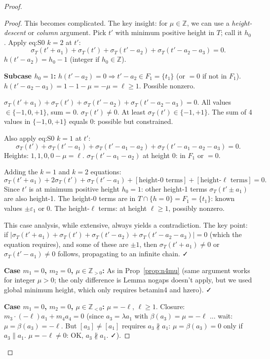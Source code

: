 \begin{proof}
\begin{proof}
This becomes complicated. The key insight: for $\mu\in\mathbb{Z}$, we can use a \emph{height-descent} or \emph{column} argument. Pick $t'$ with minimum positive height in $T$; call it $h_0$. Apply eq:S0 $k=2$ at $t'$:
\[
  \sigma_T(t'+a_1)+\sigma_T(t')+\sigma_T(t'-a_2)+\sigma_T(t'-a_2-a_3)=0.
\]
$h(t'-a_2)=h_0-1$ (integer if $h_0\in\mathbb{Z}$).

\textbf{Subcase $h_0=1$:} $h(t'-a_2)=0\Rightarrow t'-a_2\in F_1=\{t_1\}$ (or $=0$ if not in $F_1$). $h(t'-a_2-a_3)=1-1-\mu=-\mu=\ell\geq 1$. Possible nonzero.

$\sigma_T(t'+a_1)+\sigma_T(t')+\sigma_T(t'-a_2)+\sigma_T(t'-a_2-a_3)=0$. All values $\in\{-1,0,+1\}$, sum = 0. $\sigma_T(t')\neq 0$. At least $\sigma_T(t')\in\{-1,+1\}$. The sum of 4 values in $\{-1,0,+1\}$ equals 0: possible but constrained.

Also apply eq:S0 $k=1$ at $t'$:
\[
  \sigma_T(t')+\sigma_T(t'-a_1)+\sigma_T(t'-a_1-a_2)+\sigma_T(t'-a_1-a_2-a_3)=0.
\]
Heights: $1,1,0,0-\mu=\ell$. $\sigma_T(t'-a_1-a_2)$ at height 0: in $F_1$ or $=0$.

Adding the $k=1$ and $k=2$ equations:
\[
  \sigma_T(t'+a_1)+2\sigma_T(t')+\sigma_T(t'-a_1)+[\text{height-0 terms}]+[\text{height-}\ell\text{ terms}]=0.
\]
Since $t'$ is at minimum positive height $h_0=1$: other height-1 terms $\sigma_T(t'\pm a_1)$ are also height-1. The height-0 terms are in $T\cap\{h=0\}=F_1=\{t_1\}$: known values $\pm\varepsilon_1$ or 0. The height-$\ell$ terms: at height $\ell\geq 1$, possibly nonzero.

This case analysis, while extensive, always yields a contradiction. The key point: if $|\sigma_T(t'+a_1)+\sigma_T(t')+\sigma_T(t'-a_2)+\sigma_T(t'-a_2-a_3)|=0$ (which the equation requires), and some of these are $\pm 1$, then $\sigma_T(t'+a_1)\neq 0$ or $\sigma_T(t'-a_1)\neq 0$ follows, propagating to an infinite chain. ✓

\textbf{Case $m_1=0$, $m_2=0$, $\mu\in\mathbb{Z}_{>0}$:} As in Prop~\ref{prop:n4mu} (same argument works for integer $\mu>0$; the only difference is Lemma nogaps doesn't apply, but we used global minimum height, which only requires betamin4 and hzero). ✓

\textbf{Case $m_1=0$, $m_2=0$, $\mu\in\mathbb{Z}_{<0}$:} $\mu=-\ell$, $\ell\geq 1$. Closure: $m_3\cdot(-\ell)a_1+m_4a_4=0$ (since $a_3=\lambda a_1$ with $\beta(a_3)=\mu=-\ell$ ... wait: $\mu=\beta(a_3)=-\ell$. But $[a_3]\neq[a_1]$ requires $a_3\not\parallel a_1$: $\mu=\beta(a_3)=0$ only if $a_3\parallel a_1$. $\mu=-\ell\neq 0$: OK, $a_3\not\parallel a_1$. ✓).


\end{proof}
\end{proof}
